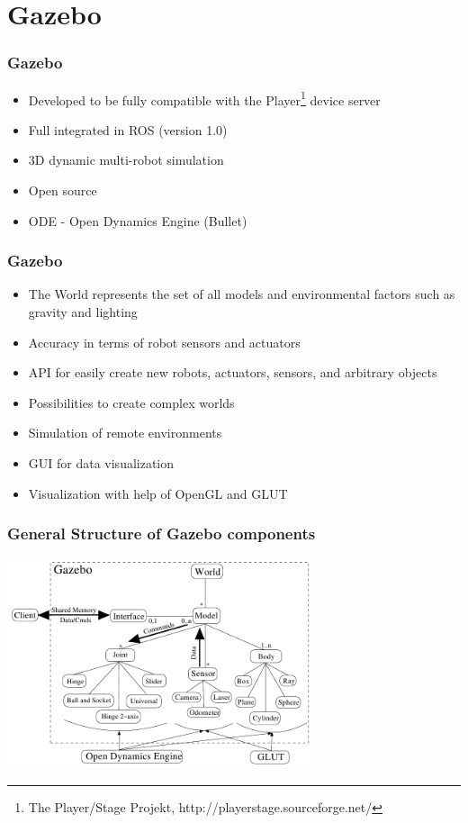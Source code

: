 \documentclass[t]{beamer}
\begin{document}
\section{Gazebo} %
\begin{frame}
  \frametitle{Gazebo}
\begin{itemize}
    \item Developed to be fully compatible with the Player\footnote{The Player/Stage Projekt, http://playerstage.sourceforge.net/} device server
    \item Full integrated in ROS (version 1.0)
    \item 3D dynamic multi-robot simulation
    \item Open source
    \item ODE -  Open Dynamics Engine (Bullet)

   
\end{itemize}
\end{frame}

\begin{frame}
  \frametitle{Gazebo}
\begin{itemize}
    \item The World represents the set of all models and environmental factors such as gravity and lighting
    \item Accuracy in terms of robot sensors and actuators
    \item API for easily create new robots, actuators, sensors, and arbitrary objects
    \item Possibilities to create complex worlds
    \item Simulation of remote environments
    \item GUI for data visualization
    \item Visualization with help of OpenGL and GLUT
    
\end{itemize}
\end{frame}

\begin{frame}
  \frametitle{General Structure of Gazebo components}
\includegraphics[width=9cm]{img/gazebo_struktur.png}
\end{frame}
\end{document}
